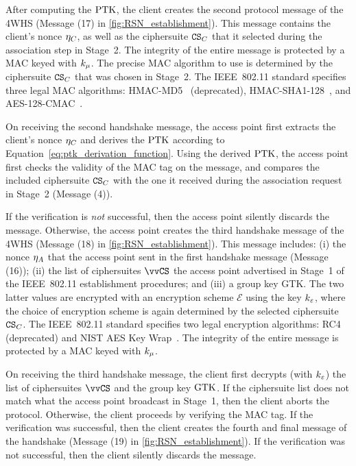 After computing the $\mathrm{PTK}$,
the client creates the second protocol message of the 4WHS (Message (17) in \cref{fig:RSN_establishment}).
This message contains the client's nonce $\eta_C$,
as well as the ciphersuite $\mathtt{CS}_C$ that it selected during the association step in Stage~2.
The integrity of the entire message is protected by a MAC keyed with $k_\mu$.
The precise MAC algorithm to use is determined by the ciphersuite $\mathtt{CS}_C$ that was chosen in Stage~2.
The IEEE~802.11 standard specifies three legal MAC algorithms:
HMAC-MD5~\cite{IETF:RFC2104:HMAC} (deprecated), 
HMAC-SHA1-128~\cite{IETF:RFC2104:HMAC},
and AES-128-CMAC~\cite{FIPS:SP-800-38B:CMAC}. 

On receiving the second handshake message,
the access point first extracts the client's nonce $\eta_C$ and derives the $\mathrm{PTK}$ according to Equation~\eqref{eq:ptk_derivation_function}.  
Using the derived $\mathrm{PTK}$, the access point first checks the validity of the MAC tag on the message,
and compares the included ciphersuite $\mathtt{CS}_C$ with the one it received during the association request in Stage~2 (Message (4)).

If the verification is \emph{not} successful,
then the access point silently discards the message.
Otherwise,
the access point creates the third handshake message of the 4WHS (Message (18) in \cref{fig:RSN_establishment}).
This message includes: (i) the nonce $\eta_{A}$ that the access point sent in the first handshake message (Message (16));
(ii) the list of ciphersuites $\CSlist$ the access point advertised in Stage~1 of the IEEE~802.11 establishment procedures;
and (iii) a group key GTK.
The two latter values are encrypted with an encryption scheme $\mathcal{E}$ using the key $k_\varepsilon$,
where the choice of encryption scheme is again determined by the selected ciphersuite $\mathtt{CS}_C$.
The IEEE~802.11 standard specifies two legal encryption algorithms:
RC4 (deprecated) and NIST AES Key Wrap~\cite{IETF:RFC3394:AES-key-wrap}. 
The integrity of the entire message is protected by a MAC keyed with $k_\mu$.

On receiving the third handshake message,
the client first decrypts (with $k_\varepsilon$)
the list of ciphersuites $\CSlist$ and the group key $\mathrm{GTK}$.
If the ciphersuite list does not match what the access point broadcast in Stage~1,
then the client aborts the protocol.
Otherwise,
the client proceeds by verifying the MAC tag.
If the verification was successful,
then the client creates the fourth and final message of the handshake (Message (19) in \cref{fig:RSN_establishment}).
If the verification was not successful,
then the client silently discards the message.



